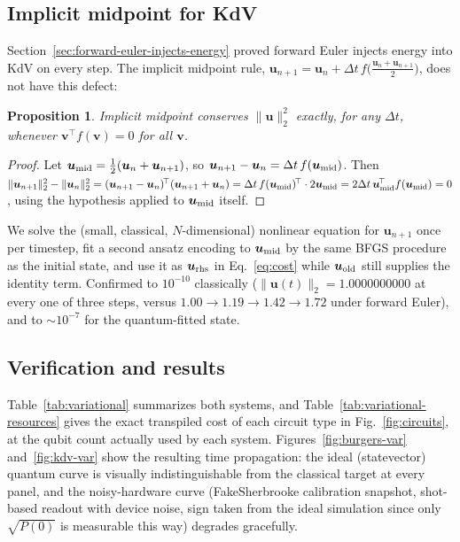 \documentclass[aps,pra,twocolumn,notitlepage,superscriptaddress,floatfix,10pt]{revtex4-2}
\newtheorem{proposition}{Proposition}
\newcommand{\norm}[1]{\lVert #1 \rVert}
\begin{document}
\subsection{Implicit midpoint for KdV}
\label{sec:implicit-midpoint}
Section~\ref{sec:forward-euler-injects-energy} proved forward Euler injects energy into KdV on every
step. The implicit midpoint rule, $\bm u_{n+1}=\bm u_n+\Delta t\,f\!\big(\tfrac{\bm u_n+\bm u_{n+1}}2\big)$,
does not have this defect:
\begin{proposition}
Implicit midpoint conserves $\norm{\bm u}_2^2$ exactly, for any $\Delta t$, whenever
$\bm v^{\!\top}f(\bm v)=0$ for all $\bm v$.
\end{proposition}
\begin{proof}
Let $\bm u_{\rm mid}=\tfrac12(\bm u_n+\bm u_{n+1})$, so $\bm u_{n+1}-\bm u_n=\Delta t\,f(\bm u_{\rm
mid})$. Then $\norm{\bm u_{n+1}}_2^2-\norm{\bm u_n}_2^2=(\bm u_{n+1}-\bm u_n)^{\!\top}(\bm u_{n+1}
+\bm u_n)=\Delta t\,f(\bm u_{\rm mid})^{\!\top}\cdot2\bm u_{\rm mid}=2\Delta t\,\bm u_{\rm mid}^{\!\top}
f(\bm u_{\rm mid})=0$, using the hypothesis applied to $\bm u_{\rm mid}$ itself.
\end{proof}
We solve the (small, classical, $N$-dimensional) nonlinear equation for $\bm u_{n+1}$ once per
timestep, fit a second ansatz encoding to $\bm u_{\rm mid}$ by the same BFGS procedure as the initial
state, and use it as $\bm u_{\rm rhs}$ in Eq.~\eqref{eq:cost} while $\bm u_{\rm old}$ still supplies
the identity term. Confirmed to $10^{-10}$ classically ($\norm{\bm u(t)}_2=1.0000000000$ at every one
of three steps, versus $1.00\to1.19\to1.42\to1.72$ under forward Euler), and to $\sim10^{-7}$ for the
quantum-fitted state.

\subsection{Verification and results}
Table~\ref{tab:variational} summarizes both systems, and Table~\ref{tab:variational-resources} gives
the exact transpiled cost of each circuit type in Fig.~\ref{fig:circuits}, at the qubit count actually
used by each system. Figures~\ref{fig:burgers-var} and~\ref{fig:kdv-var} show the resulting time
propagation: the ideal (statevector) quantum curve is visually indistinguishable from the classical
target at every panel, and the noisy-hardware curve (FakeSherbrooke calibration
snapshot, shot-based readout with device noise, sign taken from the ideal simulation since only
$\sqrt{P(0)}$ is measurable this way) degrades gracefully.
\end{document}
